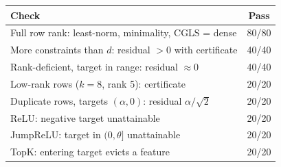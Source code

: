 \begin{tabular}{lc}
\toprule
Check & Pass \\
\midrule
Full row rank: least-norm, minimality, CGLS = dense & 80/80 \\
More constraints than $d$: residual $>0$ with certificate & 40/40 \\
Rank-deficient, target in range: residual $\approx 0$ & 40/40 \\
Low-rank rows ($k{=}8$, rank 5): certificate & 20/20 \\
Duplicate rows, targets $(\alpha,0)$: residual $\alpha/\sqrt2$ & 20/20 \\
ReLU: negative target unattainable & 20/20 \\
JumpReLU: target in $(0,\theta]$ unattainable & 20/20 \\
TopK: entering target evicts a feature & 20/20 \\
\bottomrule
\end{tabular}
